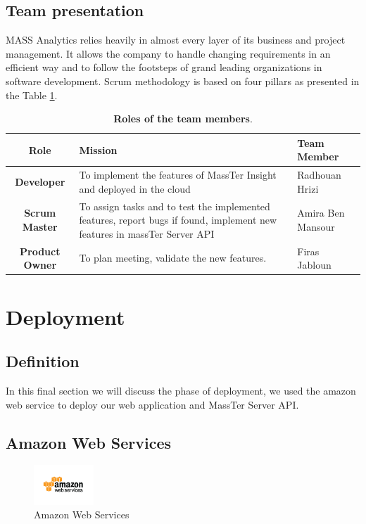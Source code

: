 \subsection{Team presentation}
MASS Analytics relies heavily in almost every layer of its business and project management. It allows the company to handle changing requirements in an efficient way and to follow the footsteps of grand leading organizations in software development.
Scrum methodology is based on four pillars as presented in the Table \ref{RTM}.

 \begin{table}[!h]
	\caption{\textbf{Roles of the team members}.}
	\label{RTM}
	\centering
	
	\begin{tabular}{|c|p{8cm}|p{5cm}|}
		\hline 	
		\textbf{Role } & \textbf{Mission } & \textbf{Team Member }  \\ 
		\hline                     
		\textbf{Developer} & To implement the features of MassTer Insight and deployed in the cloud & Radhouan Hrizi \\
		\hline 
		\textbf{Scrum Master} & To assign tasks and to test the implemented features, report bugs if found, implement new features in massTer Server API & Amira Ben Mansour \\
		\hline 
		\textbf{Product Owner} & To plan meeting, validate the new features. & Firas Jabloun \\  
		\hline 
		
	\end{tabular}
\end{table}


\section{Deployment}

\subsection{Definition}
In this final section we will discuss the phase of deployment, we used the amazon web service to deploy our web application and MassTer Server API.
\subsection{Amazon Web Services}
\begin{figure}[!h]
	\centering
	\includegraphics[width=0.2\textwidth]{aws-logo.png}
	\caption[Amazon Web Services]{Amazon Web Services \cite{ref14}}
\end{figure}
